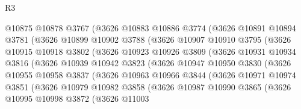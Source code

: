 \begin{lexlean}{R3}
\begin{coremodule}
                  @10875
                  @10878
                  @3767
                  (@3626
                    @10883
                    @10886
                    @3774
                    (@3626
                      @10891
                      @10894
                      @3781
                      (@3626
                        @10899
                        @10902
                        @3788
                        (@3626
                          @10907
                          @10910
                          @3795
                          (@3626
                            @10915
                            @10918
                            @3802
                            (@3626
                              @10923
                              @10926
                              @3809
                              (@3626
                                @10931
                                @10934
                                @3816
                                (@3626
                                  @10939
                                  @10942
                                  @3823
                                  (@3626
                                    @10947
                                    @10950
                                    @3830
                                    (@3626
                                      @10955
                                      @10958
                                      @3837
                                      (@3626
                                        @10963
                                        @10966
                                        @3844
                                        (@3626
                                          @10971
                                          @10974
                                          @3851
                                          (@3626
                                            @10979
                                            @10982
                                            @3858
                                            (@3626
                                              @10987
                                              @10990
                                              @3865
                                              (@3626
                                                @10995
                                                @10998
                                                @3872
                                                (@3626
                                                  @11003

\end{coremodule}
\end{lexlean}
